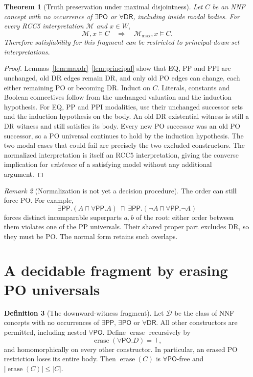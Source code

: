 \documentclass[11pt,letterpaper]{article}
\newcommand{\PP}{\mathsf{PP}}
\newcommand{\PO}{\mathsf{PO}}
\newcommand{\DR}{\mathsf{DR}}
\newcommand{\er}{\operatorname{erase}}
\newtheorem{theorem}{Theorem}[section]
\theoremstyle{definition}
\newtheorem{definition}[theorem]{Definition}
\theoremstyle{remark}
\newtheorem{remark}[theorem]{Remark}
\begin{document}
\begin{theorem}[Truth preservation under maximal disjointness]
\label{thm:normalization}
Let $C$ be an NNF concept with no occurrence of $\exists\PO$ or
$\forall\DR$, including inside modal bodies. For every RCC5
interpretation $\mathcal M$ and $x\in W$,
\[
\mathcal M,x\models C\quad\Longrightarrow\quad
\mathcal M_{\max},x\models C.
\]
Therefore satisfiability for this fragment can be restricted to
principal-down-set interpretations.
\end{theorem}
\begin{proof}
Lemmas~\ref{lem:maxdr}--\ref{lem:principal} show that EQ, PP and PPI are
unchanged, old DR edges remain DR, and only old PO edges can change, each
either remaining PO or becoming DR. Induct on $C$. Literals, constants and
Boolean connectives follow from the unchanged valuation and the induction
hypothesis. For EQ, PP and PPI modalities, use their unchanged successor
sets and the induction hypothesis on the body. An old DR existential
witness is still a DR witness and still satisfies its body. Every new PO
successor was an old PO successor, so a PO universal continues to hold by
the induction hypothesis. The two modal cases that could fail are
precisely the two excluded constructors. The normalized interpretation is
itself an RCC5 interpretation, giving the converse implication for
\emph{existence} of a satisfying model without any additional argument.
\end{proof}

\begin{remark}[Normalization is not yet a decision procedure]
The order can still force PO. For example,
\[
\exists\PP.(A\sqcap\forall\PP.A)
\ \sqcap\
\exists\PP.(\neg A\sqcap\forall\PP.\neg A)
\]
forces distinct incomparable superparts $a,b$ of the root: either order
between them violates one of the PP universals. Their shared proper part
excludes DR, so they must be PO. The normal form retains such overlaps.
\end{remark}

\section{A decidable fragment by erasing PO universals}
\label{sec:erasure}

\begin{definition}[The downward-witness fragment]
Let $\mathcal D$ be the class of NNF concepts with no occurrences of
$\exists\PP$, $\exists\PO$ or $\forall\DR$. All other constructors
are permitted, including nested $\forall\PO$.
Define $\er$ recursively by
\[
\er(\forall\PO.D)=\top,
\]
and homomorphically on every other constructor. In particular, an erased
PO restriction loses its entire body. Then $\er(C)$ is $\forall\PO$-free
and $|\er(C)|\leq |C|$.
\end{definition}
\end{document}
